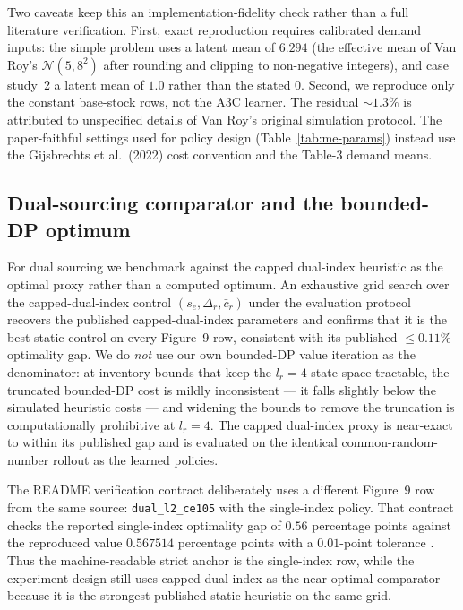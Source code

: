 \documentclass[11pt]{article}
\begin{document}
Two caveats keep this an implementation-fidelity check rather than a full literature verification.
First, exact reproduction requires calibrated demand inputs: the simple problem uses a latent mean
of $6.294$ (the effective mean of Van Roy's $\mathcal{N}(5,8^2)$ after rounding and clipping to
non-negative integers), and case study~2 a latent mean of $1.0$ rather than the stated $0$. Second,
we reproduce only the constant base-stock rows, not the A3C learner. The residual $\sim 1.3\%$ is
attributed to unspecified details of Van Roy's original simulation protocol. The paper-faithful
settings used for policy design (Table~\ref{tab:me-params}) instead use the Gijsbrechts et al.\ (2022)
cost convention and the Table-3 demand means.

\subsection{Dual-sourcing comparator and the bounded-DP optimum}
\label{app:ds-validation}

For dual sourcing we benchmark against the capped dual-index heuristic as the optimal proxy rather
than a computed optimum. An exhaustive grid search over the capped-dual-index control
$(s_e,\Delta_r,\bar c_r)$ under the evaluation protocol recovers the published capped-dual-index
parameters and confirms that it is the best static control on every Figure~9 row, consistent with
its published $\le0.11\%$ optimality gap. We do \emph{not} use our own bounded-DP value iteration as
the denominator: at inventory bounds that keep the $l_r=4$ state space tractable, the truncated
bounded-DP cost is mildly inconsistent --- it falls slightly below the simulated heuristic costs ---
and widening the bounds to remove the truncation is computationally prohibitive at $l_r=4$. The
capped dual-index proxy is near-exact to within its published gap and is evaluated on the identical
common-random-number rollout as the learned policies.

The README verification contract deliberately uses a different Figure~9 row from the same source:
\texttt{dual\_l2\_ce105} with the single-index policy. That contract checks the reported
single-index optimality gap of $0.56$ percentage points against the reproduced value
$0.567514$ percentage points with a $0.01$-point tolerance
\citep[Section~6.2 / Figure~9]{gijsbrechts2022drl}. Thus the machine-readable strict anchor is the
single-index row, while the experiment design still uses capped dual-index as the near-optimal
comparator because it is the strongest published static heuristic on the same grid.
\end{document}
